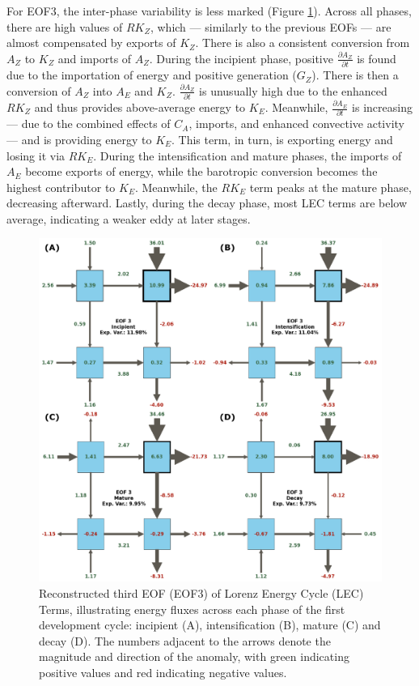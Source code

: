 For EOF3, the inter-phase variability is less marked (Figure \ref{fig:eof3_phases}). Across all phases, there are high values of $RK_Z$, which — similarly to the previous EOFs — are almost compensated by exports of $K_Z$. There is also a consistent conversion from $A_Z$ to $K_Z$ and imports of $A_Z$. During the incipient phase, positive $\frac{\partial A_Z}{\partial t}$ is found due to the importation of energy and positive generation ($G_Z$). There is then a conversion of $A_Z$ into $A_E$ and $K_Z$. $\frac{\partial A_Z}{\partial t}$ is unusually high due to the enhanced $RK_Z$ and thus provides above-average energy to $K_E$. Meanwhile, $\frac{\partial A_E}{\partial t}$ is increasing — due to the combined effects of $C_A$, imports, and enhanced convective activity — and is providing energy to $K_E$. This term, in turn, is exporting energy and losing it via $RK_E$. During the intensification and mature phases, the imports of $A_E$ become exports of energy, while the barotropic conversion becomes the highest contributor to $K_E$. Meanwhile, the $RK_E$ term peaks at the mature phase, decreasing afterward. Lastly, during the decay phase, most LEC terms are below average, indicating a weaker eddy at later stages.

\begin{figure}[!htbp]
\centering
\includegraphics[width=\textwidth]{figs_5/eof3_phases_reconstructed.pdf}
\caption[Reconstructed EOF3 - Phases]{Reconstructed third EOF (EOF3) of Lorenz Energy Cycle (LEC) Terms, illustrating energy fluxes across each phase of the first development cycle: incipient (A), intensification (B), mature (C) and decay (D).  The numbers adjacent to the arrows denote the magnitude and direction of the anomaly, with green indicating positive values and red indicating negative values.}
\label{fig:eof3_phases}
\end{figure}

